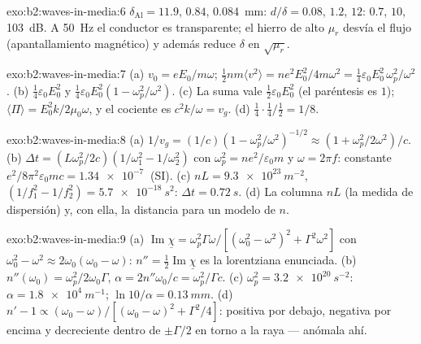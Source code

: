 \begin{solution}{exo:b2:waves-in-media:6}
$\delta_{\text{Al}} = 11.9$, $0.84$, \qty{0.084}{mm}: $d/\delta = 0.08$, $1.2$, $12$: $0.7$,
$10$, \qty{103}{dB}. A \qty{50}{Hz} el conductor es transparente; el hierro de alto
$\mu_r$ desvía el flujo (apantallamiento magnético) y además reduce $\delta$ en
$\sqrt{\mu_r}$.
\end{solution}

\begin{solution}{exo:b2:waves-in-media:7}
(a) $v_0 = eE_0/m\omega$; $\tfrac12nm\langle v^2\rangle = ne^2E_0^2/4m\omega^2 = \tfrac14\varepsilon_0
E_0^2\,\omega_p^2/\omega^2$. (b) $\tfrac14\varepsilon_0E_0^2$ y $\tfrac14\varepsilon_0E_0^2(1 - \omega_p^2/
\omega^2)$. (c) La suma vale $\tfrac12\varepsilon_0E_0^2$ (el paréntesis es $1$); $\langle\Pi
\rangle = E_0^2k/2\mu_0\omega$, y el cociente es $c^2k/\omega = v_g$. (d) $\tfrac14\cdot\tfrac14
/\tfrac12 = 1/8$.
\end{solution}

\begin{solution}{exo:b2:waves-in-media:8}
(a) $1/v_g = (1/c)(1 - \omega_p^2/\omega^2)^{-1/2} \approx (1 + \omega_p^2/2\omega^2)/c$. (b) $\Delta t
= (L\omega_p^2/2c)(1/\omega_1^2 - 1/\omega_2^2)$ con $\omega_p^2 = ne^2/\varepsilon_0m$ y $\omega =
2\pi f$: constante $e^2/8\pi^2\varepsilon_0mc = \qty{1.34e-7}{}$ (SI). (c) $nL = \qty{9.3e23}{m^{-2}}$,
$(1/f_1^2 - 1/f_2^2) = \qty{5.7e-18}{s^2}$: $\Delta t = \qty{0.72}{s}$. (d) La columna $nL$
(la medida de dispersión) y, con ella, la distancia para un modelo de $n$.
\end{solution}

\begin{solution}{exo:b2:waves-in-media:9}
(a) $\operatorname{Im}\underline\chi = \omega_p^2\Gamma\omega/[(\omega_0^2 - \omega^2)^2 + \Gamma^2\omega^2]$ con
$\omega_0^2 - \omega^2 \approx 2\omega_0(\omega_0 - \omega)$: $n'' = \tfrac12\operatorname{Im}\underline\chi$ es
la lorentziana enunciada. (b) $n''(\omega_0) = \omega_p^2/2\omega_0\Gamma$, $\alpha = 2n''\omega_0/c =
\omega_p^2/\Gamma c$. (c) $\omega_p^2 = \qty{3.2e20}{s^{-2}}$: $\alpha = \qty{1.8e4}{m^{-1}}$;
$\ln10/\alpha = \qty{0.13}{mm}$. (d) $n' - 1 \propto (\omega_0 - \omega)/[(\omega_0 - \omega)^2 +
\Gamma^2/4]$: positiva por debajo, negativa por encima y decreciente dentro de $\pm\Gamma/2$
en torno a la raya --- anómala ahí.
\end{solution}

